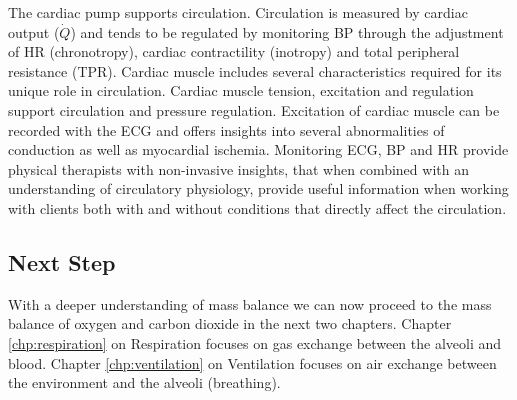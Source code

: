 The cardiac pump supports circulation. Circulation is measured by cardiac output ($\dot{Q}$) and tends to be regulated by monitoring BP through the adjustment of HR (chronotropy), cardiac contractility (inotropy) and total peripheral resistance (TPR). Cardiac muscle includes several characteristics required for its unique role in circulation. Cardiac muscle tension, excitation and regulation support circulation and pressure regulation. Excitation of cardiac muscle can be recorded with the ECG and offers insights into several abnormalities of conduction as well as myocardial ischemia. Monitoring ECG, BP and HR provide physical therapists with non-invasive insights, that when combined with an understanding of circulatory physiology, provide useful information when working with clients both with and without conditions that directly affect the circulation.

\subsection{Next Step}

With a deeper understanding of mass balance we can now proceed to the mass balance of oxygen and carbon dioxide in the next two chapters. Chapter \ref{chp:respiration} on Respiration focuses on gas exchange between the alveoli and blood. Chapter \ref{chp:ventilation} on Ventilation focuses on air exchange between the environment and the alveoli (breathing).

\printbibliography[heading=subbibintoc]